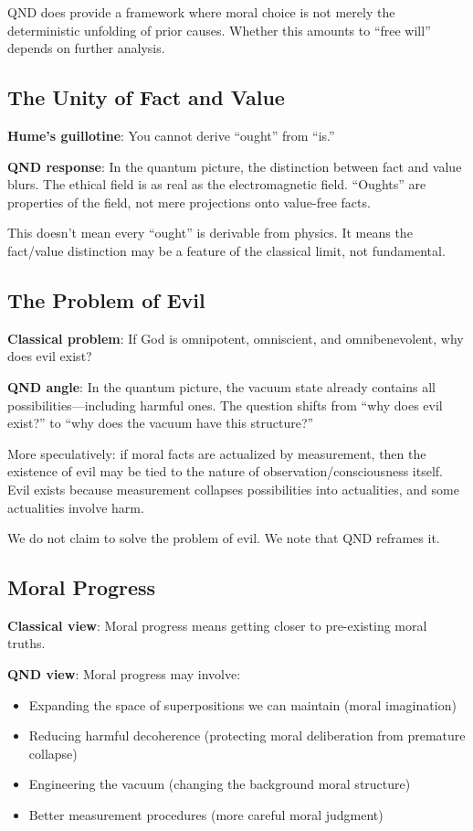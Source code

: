 \documentclass[12pt]{article}
\begin{document}
QND does provide a framework where moral choice is not merely the deterministic unfolding of prior causes. Whether this amounts to ``free will'' depends on further analysis.

\subsection{The Unity of Fact and Value}

\textbf{Hume's guillotine}: You cannot derive ``ought'' from ``is.''

\textbf{QND response}: In the quantum picture, the distinction between fact and value blurs. The ethical field is as real as the electromagnetic field. ``Oughts'' are properties of the field, not mere projections onto value-free facts.

This doesn't mean every ``ought'' is derivable from physics. It means the fact/value distinction may be a feature of the classical limit, not fundamental.

\subsection{The Problem of Evil}

\textbf{Classical problem}: If God is omnipotent, omniscient, and omnibenevolent, why does evil exist?

\textbf{QND angle}: In the quantum picture, the vacuum state already contains all possibilities---including harmful ones. The question shifts from ``why does evil exist?'' to ``why does the vacuum have this structure?''

More speculatively: if moral facts are actualized by measurement, then the existence of evil may be tied to the nature of observation/consciousness itself. Evil exists because measurement collapses possibilities into actualities, and some actualities involve harm.

We do not claim to solve the problem of evil. We note that QND reframes it.

\subsection{Moral Progress}

\textbf{Classical view}: Moral progress means getting closer to pre-existing moral truths.

\textbf{QND view}: Moral progress may involve:
\begin{itemize}
    \item Expanding the space of superpositions we can maintain (moral imagination)
    \item Reducing harmful decoherence (protecting moral deliberation from premature collapse)
    \item Engineering the vacuum (changing the background moral structure)
    \item Better measurement procedures (more careful moral judgment)
\end{itemize}
\end{document}
